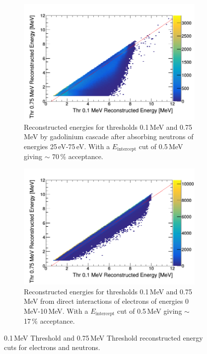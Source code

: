 \documentclass[12pt,a4paper]{article}
\begin{document}
\begin{figure}[H]
\centering
\begin{subfigure}{.5\textwidth}
  \centering
  \includegraphics[width=\linewidth]{5n3000spread_recon_dual_thresh_0_1_0_75_line.png}
  \captionsetup{width=.9\linewidth}
  \caption{Reconstructed energies for thresholds 0.1\,MeV and 0.75\,MeV by gadolinium cascade after absorbing neutrons of energies 25\,eV-75\,eV. With a $E_\textrm{intercept}$ cut of 0.5\,MeV giving $\sim$ 70\,\% acceptance.}
  \label{2drecon_n_cut}
\end{subfigure}%
\begin{subfigure}{.5\textwidth}
  \centering
  \includegraphics[width=\linewidth]{5e3000spread_recon_dual_thresh_0_1_0_75_line.png}
  \captionsetup{width=.9\linewidth}
  \caption{Reconstructed energies for thresholds 0.1\,MeV and 0.75\,MeV from direct interactions of electrons of energies 0\,MeV-10\,MeV. With a $E_\textrm{intercept}$ cut of 0.5\,MeV giving $\sim$ 17\,\% acceptance.}
  \label{2drecon_e_cut}
\end{subfigure}
\caption{0.1\,MeV Threshold and 0.75\,MeV Threshold reconstructed energy cuts for electrons and neutrons.}
\label{thr_thr_cut}
\end{figure}
\end{document}
